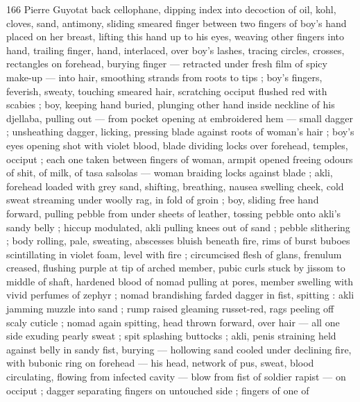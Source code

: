 166 Pierre Guyotat
back cellophane, dipping index into decoction of oil, kohl, cloves,
sand, antimony, sliding smeared finger between two fingers of boy's
hand placed on her breast, lifting this hand up to his eyes, weaving
other fingers into hand, trailing finger, hand, interlaced, over boy's
lashes, tracing circles, crosses, rectangles on forehead, burying
finger — retracted under fresh film of spicy make-up — into hair,
smoothing strands from roots to tips ; boy's fingers, feverish, sweaty,
touching smeared hair, scratching occiput flushed red with scabies ;
boy, keeping hand buried, plunging other hand inside neckline of his
djellaba, pulling out — from pocket opening at embroidered hem —
small dagger ; unsheathing dagger, licking, pressing blade against
roots of woman's hair ; boy's eyes opening shot with violet blood,
blade dividing locks over forehead, temples, occiput ; each one taken
between fingers of woman, armpit opened freeing odours of shit, of
milk, of tasa salsolas — woman braiding locks against blade ; akli,
forehead loaded with grey sand, shifting, breathing, nausea swelling
cheek, cold sweat streaming under woolly rag, in fold of groin ; boy,
sliding free hand forward, pulling pebble from under sheets of
leather, tossing pebble onto akli's sandy belly ; hiccup modulated,
akli pulling knees out of sand ; pebble slithering ; body rolling, pale,
sweating, abscesses bluish beneath fire, rims of burst buboes
scintillating in violet foam, level with fire ; circumcised flesh of glans,
frenulum creased, flushing purple at tip of arched member, pubic
curls stuck by jissom to middle of shaft, hardened blood of nomad
pulling at pores, member swelling with vivid perfumes of zephyr ;
nomad brandishing farded dagger in fist, spitting : akli jamming
muzzle into sand ; rump raised gleaming russet-red, rags peeling off
scaly cuticle ; nomad again spitting, head thrown forward, over hair
— all one side exuding pearly sweat ; spit splashing buttocks ; akli,
penis straining held against belly in sandy fist, burying — hollowing
sand cooled under declining fire, with bubonic ring on forehead —
his head, network of pus, sweat, blood circulating, flowing from
infected cavity — blow from fist of soldier rapist — on occiput ;
dagger separating fingers on untouched side ; fingers of one of

